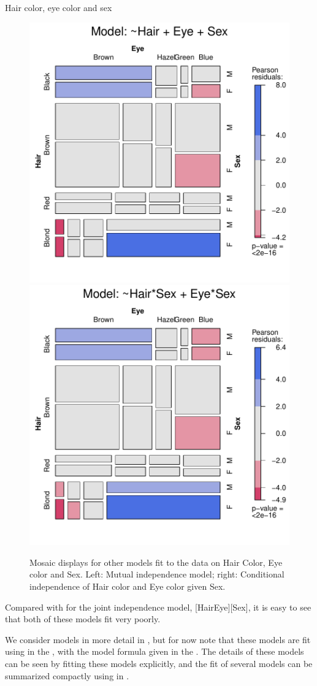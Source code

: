 \documentclass[11pt]{book}\usepackage[]{graphicx}\usepackage[]{color}
\newenvironment{knitrout}{}{} %
\renewenvironment{knitrout}{\small\renewcommand{\baselinestretch}{.85}}{} %
\begin{document}
\begin{Example}[HEC2]{Hair color, eye color and sex}
\begin{knitrout}
\begin{figure}[htbp]
\centerline{\includegraphics[width=.49\textwidth]{ch05/fig/HEC-mos21} 
\includegraphics[width=.49\textwidth]{ch05/fig/HEC-mos22} }

\caption[Mosaic displays for other models fit to the data on Hair Color, Eye color and Sex]{Mosaic displays for other models fit to the data on Hair Color, Eye color and Sex.  Left: Mutual independence model; right: Conditional independence of Hair color and Eye color given Sex.\label{fig:HEC-mos2}}
\end{figure}


\end{knitrout}

\noindent Compared with  for the joint independence model, [HairEye][Sex],
it is easy to see that both of these models fit very poorly.

We consider \loglin models in more detail in , but for now
note that these models are fit using  in the , 
with the model formula given in the .  The details of these
models can be seen by fitting these models explicitly, and the fit of
several models can be summarized compactly using 
in .


\end{Example}
\end{document}
